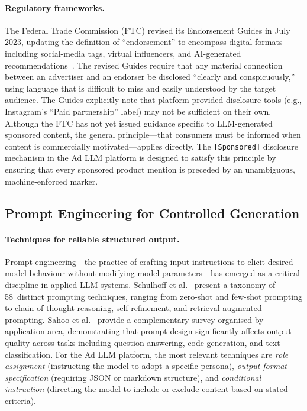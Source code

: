 \paragraph{Regulatory frameworks.}
The Federal Trade Commission (FTC) revised its Endorsement Guides in
July 2023, updating the definition of ``endorsement'' to encompass
digital formats including social-media tags, virtual influencers, and
AI-generated recommendations~\cite{ftc2023endorsement}. The revised
Guides require that any material connection between an advertiser and
an endorser be disclosed ``clearly and conspicuously,'' using language
that is difficult to miss and easily understood by the target
audience. The Guides explicitly note that platform-provided disclosure
tools (e.g., Instagram's ``Paid partnership'' label) may not be
sufficient on their own. Although the FTC has not yet issued
guidance specific to LLM-generated sponsored content, the general
principle---that consumers must be informed when content is
commercially motivated---applies directly. The \texttt{[Sponsored]}
disclosure mechanism in the Ad LLM platform is designed to satisfy
this principle by ensuring that every sponsored product mention is
preceded by an unambiguous, machine-enforced marker.

\subsection{Prompt Engineering for Controlled Generation}
\label{subsec:prompt-engineering}

\paragraph{Techniques for reliable structured output.}
Prompt engineering---the practice of crafting input instructions to
elicit desired model behaviour without modifying model
parameters---has emerged as a critical discipline in applied LLM
systems. Schulhoff et al.~\cite{schulhoff2024prompt} present a
taxonomy of 58~distinct prompting techniques, ranging from zero-shot
and few-shot prompting to chain-of-thought reasoning, self-refinement,
and retrieval-augmented prompting. Sahoo et
al.~\cite{sahoo2024prompt} provide a complementary survey organised
by application area, demonstrating that prompt design significantly
affects output quality across tasks including question answering, code
generation, and text classification. For the Ad LLM platform, the
most relevant techniques are \emph{role assignment} (instructing the
model to adopt a specific persona), \emph{output-format
specification} (requiring JSON or markdown structure), and
\emph{conditional instruction} (directing the model to include or
exclude content based on stated criteria).

